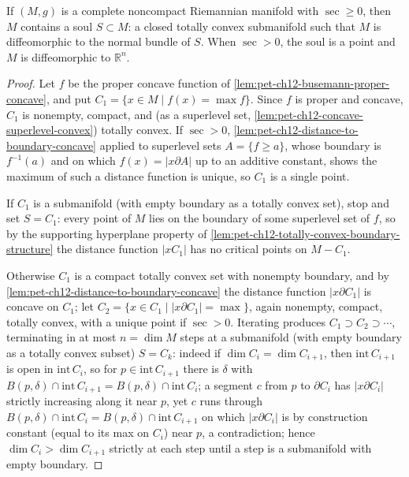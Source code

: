 \begin{theorem}
  \label{thm:pet-ch12-soul-theorem}
  If $(M,g)$ is a complete noncompact Riemannian manifold with $\sec\ge0$, then
  $M$ contains a soul $S\subset M$: a closed totally convex submanifold such
  that $M$ is diffeomorphic to the normal bundle of $S$. When $\sec>0$, the soul
  is a point and $M$ is diffeomorphic to $\mathbb{R}^n$.
\end{theorem}
\begin{proof}
  Let $f$ be the proper concave function of
  \cref{lem:pet-ch12-busemann-proper-concave}, and put
  $C_1=\{x\in M\mid f(x)=\max f\}$. Since $f$ is proper and concave, $C_1$ is
  nonempty, compact, and (as a superlevel set,
  \cref{lem:pet-ch12-concave-superlevel-convex}) totally convex. If $\sec>0$,
  \cref{lem:pet-ch12-distance-to-boundary-concave} applied to superlevel sets
  $A=\{f\ge a\}$, whose boundary is $f^{-1}(a)$ and on which $f(x)=|x\partial A|$
  up to an additive constant, shows the maximum of such a distance function is
  unique, so $C_1$ is a single point.

  If $C_1$ is a submanifold (with empty boundary as a totally convex set), stop
  and set $S=C_1$: every point of $M$ lies on the boundary of some superlevel
  set of $f$, so by the supporting hyperplane property of
  \cref{lem:pet-ch12-totally-convex-boundary-structure} the distance function
  $|xC_1|$ has no critical points on $M-C_1$.

  Otherwise $C_1$ is a compact totally convex set with nonempty boundary, and by
  \cref{lem:pet-ch12-distance-to-boundary-concave} the distance function
  $|x\partial C_1|$ is concave on $C_1$; let
  $C_2=\{x\in C_1\mid|x\partial C_1|=\max\}$, again nonempty, compact, totally
  convex, with a unique point if $\sec>0$. Iterating produces
  $C_1\supset C_2\supset\cdots$, terminating in at most $n=\dim M$ steps at a
  submanifold (with empty boundary as a totally convex subset) $S=C_k$: indeed
  if $\dim C_i=\dim C_{i+1}$, then $\mathrm{int}\,C_{i+1}$ is open in
  $\mathrm{int}\,C_i$, so for $p\in\mathrm{int}\,C_{i+1}$ there is $\delta$ with
  $B(p,\delta)\cap\mathrm{int}\,C_{i+1}=B(p,\delta)\cap\mathrm{int}\,C_i$; a
  segment $c$ from $p$ to $\partial C_i$ has $|x\partial C_i|$ strictly
  increasing along it near $p$, yet $c$ runs through
  $B(p,\delta)\cap\mathrm{int}\,C_i=B(p,\delta)\cap\mathrm{int}\,C_{i+1}$ on
  which $|x\partial C_i|$ is by construction constant (equal to its max on
  $C_i$) near $p$, a contradiction; hence $\dim C_i>\dim C_{i+1}$ strictly at
  each step until a step is a submanifold with empty boundary.


\end{proof}

